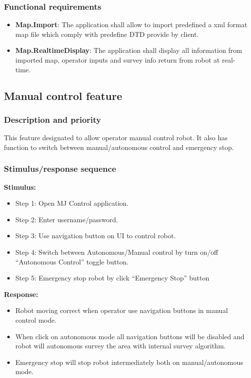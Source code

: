 \documentclass[10pt,a4paper,titlepage]{article}
\begin{document}
	\subsubsection{Functional requirements}
	\begin{itemize}
		\item \textbf{Map.Import}: The application shall allow to import predefined a xml format map file which comply with predefine DTD provide by client.
		\item \textbf{Map.RealtimeDisplay}: The application shall display all information from imported map, operator inputs and survey info return from robot at real-time.
	\end{itemize}
	
	\subsection{Manual control feature }
	\subsubsection{Description and priority}
	\text This feature designated to allow operator manual control robot. It also has function to switch between manual/autonomous control and emergency stop.
	\subsubsection{Stimulus/response sequence}
	\textbf{Stimulus:}
	\begin{itemize}
		\item Step 1: Open MJ Control application.
		\item Step 2: Enter username/password.
		\item Step 3: Use navigation button on UI to control robot.
		\item Step 4: Switch between Autonomous/Manual control by turn on/off “Autonomous Control” toggle button.
		\item Step 5: Emergency stop robot by click “Emergency Stop” button
	\end{itemize}
	\textbf{Response:}
	\begin{itemize}
		\item Robot moving correct when operator use navigation buttons in manual control mode.
		\item When click on autonomous mode all navigation buttons will be disabled and robot will autonomous survey the area with internal survey algorithm.
		\item Emergency stop will stop robot intermediately both on manual/autonomous mode.
	\end{itemize}
\end{document}
